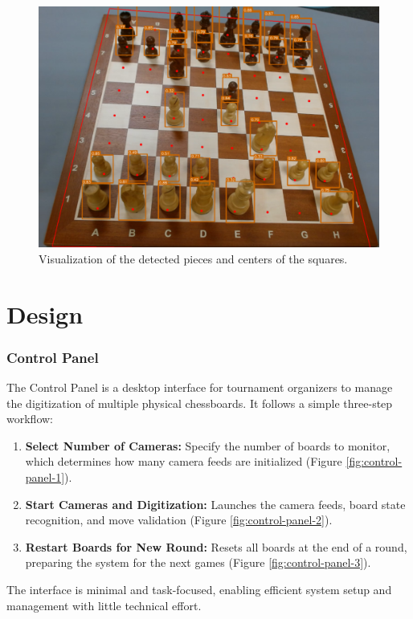 \begin{figure}[h!]
    \centering
    \includegraphics[width=0.75\linewidth]{figures/methods/ml-models/piece-model.png}
    \caption[Visualization of piece model and corner model]{Visualization of the detected pieces and centers of the squares.}
    \label{fig:websocket-vs-http}
\end{figure}

\section{Design}
\label{subsec:wireframe}

\subsubsection*{Control Panel}

The Control Panel is a desktop interface for tournament organizers to manage the digitization of multiple physical chessboards. It follows a simple three-step workflow:

\begin{enumerate}
\item \textbf{Select Number of Cameras:} Specify the number of boards to monitor, which determines how many camera feeds are initialized (Figure \ref{fig:control-panel-1}).
\item \textbf{Start Cameras and Digitization:} Launches the camera feeds, board state recognition, and move validation (Figure \ref{fig:control-panel-2}).
\item \textbf{Restart Boards for New Round:} Resets all boards at the end of a round, preparing the system for the next games (Figure \ref{fig:control-panel-3}).
\end{enumerate}

The interface is minimal and task-focused, enabling efficient system setup and management with little technical effort. \\

